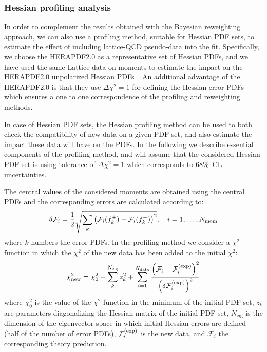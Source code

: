 \subsubsection{Hessian profiling analysis}
\label{sec:hessianprofiling}

In order to complement the results obtained
with the Bayesian reweighting approach,
we can also use a profiling method, suitable
for Hessian PDF sets, to estimate the effect of including
lattice-QCD pseudo-data into the fit. 
%
Specifically, we
choose the HERAPDF2.0 as a representative set of Hessian PDFs, and 
we have used the same Lattice data on moments to estimate the impact
on the HERAPDF2.0 unpolarized Hessian PDFs~\cite{Abramowicz:2015mha}. 
%
An additional advantage of the HERAPDF2.0 is that they use
$\Delta\chi^2=1$ for defining the Hessian error PDFs which ensures a
one to one correspondence of the profiling and reweighting methods.

In case of Hessian PDF sets, the Hessian profiling method
can be used to both check the compatibility of new data on a given PDF set,
and also  estimate the impact these data will have on the PDFs. 
In the following we describe essential components of the profiling method, 
and will assume  that the considered Hessian PDF set is using tolerance of $\Delta\chi^2=1$ 
which corresponds to 68\%~CL uncertainties.

The central values of the considered moments are obtained using the central PDFs and the corresponding
errors are calculated according to:
\begin{equation}
\delta\mathcal{F}_i = \frac{1}{2} \sqrt{\sum_{k}\left(\mathcal{F}_i(f_k^+)-\mathcal{F}_i(f_k^-)\right)^2},
\quad i=1,\ldots,N_{\rm mom}
\end{equation}
where $k$ numbers the error PDFs.
%
In the profiling method we consider a $\chi^2$ function in which the $\chi^2$ of the new
data has been added to the initial $\chi^2$:
\begin{equation}
\label{eq:newchi2}
\chi^2_{\text{new}} = \chi_0^2 + \sum_{k}^{N_{\text{eig}}} z_k^2
                    + \sum_{i=1}^{N_{\text{data}}}
                      \frac{\lp \mathcal{F}_i - \mathcal{F}_i^{\rm(exp)}\rp^2}
                           {\lp\delta\mathcal{F}_i^{\rm(exp)}\rp^2}
\end{equation}
where $\chi^2_0$ is the value of the $\chi^2$ function in the minimum of the initial PDF set,
$z_k$ are parameters diagonalizing the Hessian matrix of the initial PDF set,
$N_{\text{eig}}$ is the dimension of the eigenvector space in which initial Hessian errors are defined
(half of the number of error PDFs), $\mathcal{F}_i^{\rm(exp)}$ is the new data,
and $\mathcal{F}_i$ the corresponding theory prediction.

